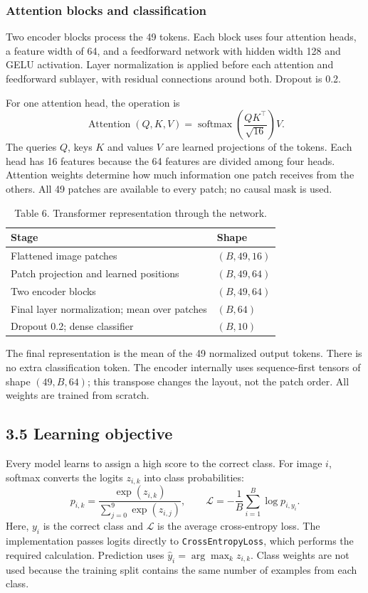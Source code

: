 \subsubsection{Attention blocks and classification}
Two encoder blocks process the 49 tokens. Each block uses four attention heads,
a feature width of 64, and a feedforward network with hidden width 128 and
GELU activation. Layer normalization is applied before each attention and
feedforward sublayer, with residual connections around both. Dropout is 0.2.

For one attention head, the operation is
\[
\operatorname{Attention}(Q,K,V)
=\operatorname{softmax}\left(\frac{QK^\top}{\sqrt{16}}\right)V.
\]
The queries $Q$, keys $K$ and values $V$ are learned projections of the tokens.
Each head has 16 features because the 64 features are divided among four heads.
Attention weights determine how much information one patch receives from the
others. All 49 patches are available to every patch; no causal mask is used.

\begin{table}[h]
\centering
\caption{Table 6. Transformer representation through the network.}
\label{tab:fresh_transformer}
\begin{tabularx}{\linewidth}{X l}
\toprule
Stage & Shape\\
\midrule
Flattened image patches & $(B,49,16)$\\
Patch projection and learned positions & $(B,49,64)$\\
Two encoder blocks & $(B,49,64)$\\
Final layer normalization; mean over patches & $(B,64)$\\
Dropout 0.2; dense classifier & $(B,10)$\\
\bottomrule
\end{tabularx}
\end{table}

The final representation is the mean of the 49 normalized output tokens.
There is no extra classification token. The encoder internally uses
sequence-first tensors of shape $(49,B,64)$; this transpose changes the layout,
not the patch order. All weights are trained from scratch.

\subsection{3.5 Learning objective}
Every model learns to assign a high score to the correct class. For image $i$,
softmax converts the logits $z_{i,k}$ into class probabilities:
\[
p_{i,k}=\frac{\exp(z_{i,k})}{\sum_{j=0}^{9}\exp(z_{i,j})},
\qquad
\mathcal{L}=-\frac{1}{B}\sum_{i=1}^{B}\log p_{i,y_i}.
\]
Here, $y_i$ is the correct class and $\mathcal{L}$ is the average cross-entropy
loss. The implementation passes logits directly to
\texttt{CrossEntropyLoss}, which performs the required calculation.
Prediction uses $\hat y_i=\arg\max_k z_{i,k}$. Class weights are not used because
the training split contains the same number of examples from each class.


